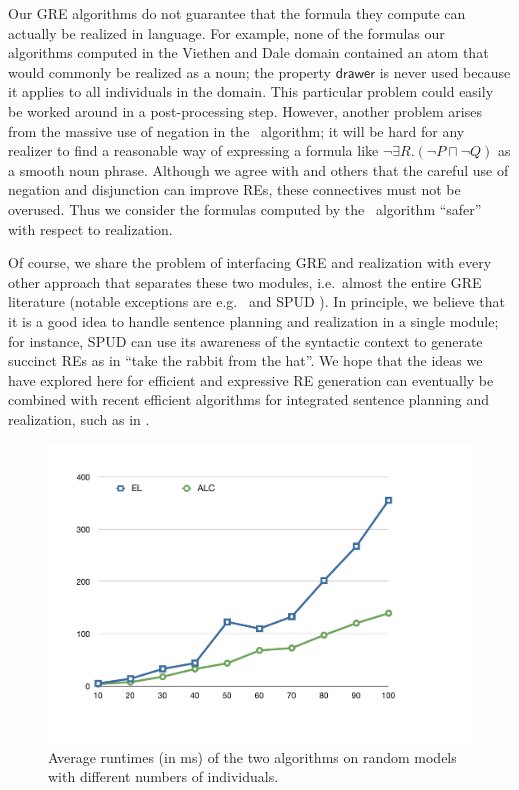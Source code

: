 Our GRE algorithms do not guarantee that the formula they compute can
actually be realized in language.  For example, none of the formulas
our algorithms computed in the Viethen and Dale domain contained an
atom that would commonly be realized as a noun; the property
$\mathsf{drawer}$ is never used because it applies to all individuals
in the domain.  This particular problem could easily be worked around
in a post-processing step.  However, another problem arises from the
massive use of negation in the \alc\ algorithm; it will be hard for
any realizer to find a reasonable way of expressing a formula like
$\neg \exists R.(\neg P \sqcap \neg Q)$ as a smooth noun phrase.
Although we agree with  and
others that the careful use of negation and disjunction can improve
REs, these connectives must not be overused.  Thus we consider the
formulas computed by the \el\ algorithm ``safer'' with respect to
realization.



Of course, we share the problem of interfacing GRE and realization
with every other approach that separates these two modules, i.e.\
almost the entire GRE literature (notable exceptions are e.g.\
 and SPUD \cite{Stone1998a}).  In principle, we
believe that it is a good idea to handle sentence planning and
realization in a single module; for instance, SPUD can use its
awareness of the syntactic context to generate succinct REs as in
``take the rabbit from the hat''.  We hope that the ideas we have
explored here for efficient and expressive RE generation can
eventually be combined with recent efficient algorithms for integrated
sentence planning and realization, such as in .


\begin{figure}[t]
  \centering
  \includegraphics[width=\columnwidth]{runtimes}\vspace*{-2ex}
  \caption{Average runtimes (in ms) of the two algorithms on random
    models with different numbers of individuals.}
  \label{fig:runtimes}\vspace*{-1.5ex}
\end{figure}

